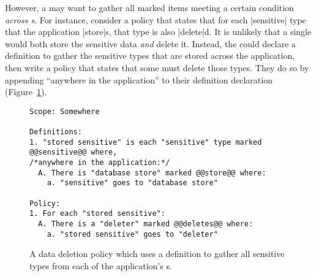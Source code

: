 However, a \ce{} may want to gather all marked items meeting a certain condition \emph{across \controller{}s}.
%
For instance, consider a policy that states that for each |sensitive| type that the application |store|s,
that type is also |delete|d.
%
It is unlikely that a single \controller{} would both store the sensitive data \emph{and} delete it.
%
Instead, the \ce{} could declare a definition to gather the sensitive types that are stored across the application,
then write a policy that states that some \controller{} must delete those types.
%
They do so by appending ``anywhere in the application'' to their definition declaration (Figure~\ref{f:anywhere-in-app}).

\begin{figure}[H]
\begin{lstlisting}[language=CNL]
Scope: Somewhere

Definitions:
1. "stored sensitive" is each "sensitive" type marked @@sensitive@@ where, 
/*anywhere in the application:*/
  A. There is "database store" marked @@store@@ where:
    a. "sensitive" goes to "database store"

Policy:
1. For each "stored sensitive":
  A. There is a "deleter" marked @@deletes@@ where:
    a. "stored sensitive" goes to "deleter"
\end{lstlisting}
\caption{A data deletion policy which uses a definition to gather
all sensitive types from each of the application's \controller{}s.}
\label{f:anywhere-in-app}
\end{figure}
